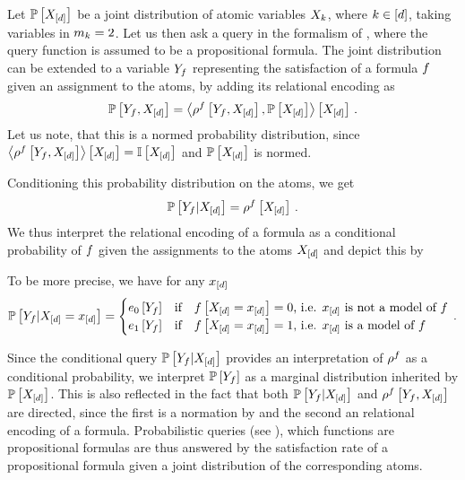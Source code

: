 
Let $\mathbb{P}\left[X_{[d]}\right]$ be a joint distribution of atomic variables $X_{k}$, where $k\in[d]$, taking variables in $m_{k}=2$.
Let us then ask a query in the formalism of , where the query function is assumed to be a propositional formula.
The joint distribution can be extended to a variable $Y_{f}$ representing the satisfaction of a formula $f$ given an assignment to the atoms, by adding its relational encoding as
\begin{align*}
	\mathbb{P}\left[Y_{f},X_{[d]}\right]
	= \left\langle \rho^{f}\left[Y_{f},X_{[d]}\right],\mathbb{P}\left[X_{[d]}\right]\right\rangle \left[ X_{[d]} \right] \, .
\end{align*}
Let us note, that this is a normed probability distribution, since $\left\langle \rho^{f}\left[Y_{f},X_{[d]}\right]\right\rangle \left[ X_{[d]} \right]=\mathbb{I}\left[X_{[d]}\right]$ and $\mathbb{P}\left[X_{[d]}\right]$ is normed.

Conditioning this probability distribution on the atoms, we get
\begin{align*}
	\mathbb{P}\left[Y_{f}|X_{[d]}\right]
	= \rho^{f}\left[X_{[d]}\right] \, .
\end{align*}
We thus interpret the relational encoding of a formula as a conditional probability of $f$ given the assignments to the atoms $X_{[d]}$ and depict this by
	\begin{center}
		
	\end{center}
To be more precise, we have for any $x_{[d]}$
\begin{align*}
	\mathbb{P}\left[Y_{f}|X_{[d]}=x_{[d]}\right] = 
	\begin{cases}
		e_0\left[Y_{f}\right] & \text{if} \quad f\left[X_{[d]}=x_{[d]}\right] = 0 \text{, i.e. $x_{[d]}$ is not a model of $f$} \\
		e_1\left[Y_{f}\right] & \text{if} \quad f\left[X_{[d]}=x_{[d]}\right] = 1 \text{, i.e. $x_{[d]}$ is a model of $f$}
	\end{cases} \, .
\end{align*}

Since the conditional query $\mathbb{P}\left[Y_{f}|X_{[d]}\right]$ provides an interpretation of $\rho^{f}$ as a conditional probability, we interpret $\mathbb{P}\left[Y_{f}\right]$ as a marginal distribution inherited by $\mathbb{P}\left[X_{[d]}\right]$.
This is also reflected in the fact that both $\mathbb{P}\left[Y_{f}|X_{[d]}\right]$ and $\rho^{f}\left[Y_{f},X_{[d]}\right]$ are directed, since the first is a normation by  and the second an relational encoding of a formula.
Probabilistic queries (see ), which functions are propositional formulas are thus answered by the satisfaction rate of a propositional formula given a joint distribution of the corresponding atoms.


